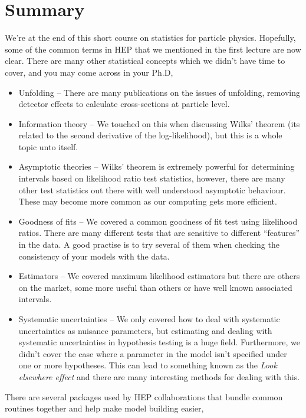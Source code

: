\section{Summary}
We're at the end of this short course on statistics for particle physics. Hopefully, some of the common terms in HEP that we mentioned in the first lecture are now clear. There are many other statistical concepts which we didn't have time to cover, and you may come across in your Ph.D,
\begin{itemize}
    \item Unfolding -- There are many publications on the issues of unfolding, removing detector effects to calculate cross-sections at particle level. 
    \item Information theory -- We touched on this when discussing Wilks' theorem (its related to the second derivative of the log-likelihood), but this is a whole topic unto itself. 
    \item Asymptotic theories -- Wilks' theorem is extremely powerful for determining intervals based on likelihood ratio test statistics, however, there are many other test statistics out there with well understood asymptotic behaviour. These may become more common as our computing gets more efficient. 
    \item Goodness of fits -- We covered a common goodness of fit test using likelihood ratios. There are many different tests that are sensitive to different ``features'' in the data. A good practise is to try several of them when checking the consistency of your models with the data. 
    \item Estimators -- We covered maximum likelihood estimators but there are others on the market, some more useful than others or have well known associated intervals.  
    \item Systematic uncertainties -- We only covered how to deal with systematic uncertainties as nuisance parameters, but estimating and dealing with systematic uncertainties in hypothesis testing is a huge field. Furthermore, we didn't cover the case where a parameter in the model isn't specified under one or more hypotheses. This can lead to something known as the \emph{Look elsewhere effect} and there are many interesting methods for dealing with this. 
\end{itemize}
There are several packages used by HEP collaborations that bundle common routines together and help make model building easier, 
